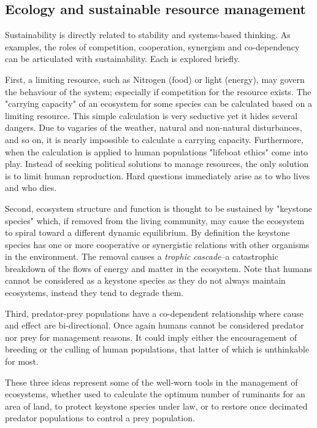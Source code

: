 \subsection{Ecology and sustainable resource management}

Sustainability is directly related to stability and systems-based thinking. As examples, the roles of competition, cooperation, synergism and co-dependency can be articulated with sustainability. Each is explored briefly.

First, a limiting resource, such as Nitrogen (food) or light (energy), may govern the behaviour of the system; especially if competition for the resource exists. The "carrying capacity" of an ecosystem for some species can be calculated based on a limiting resource. This simple calculation is very seductive yet it hides several dangers. Due to vagaries of the weather, natural and non-natural disturbances, and so on, it is nearly impossible to calculate a carrying capacity. Furthermore, when the calculation is applied to human populations "lifeboat ethics" come into play. Instead of seeking political solutions to manage resources, the only solution is to limit human reproduction. Hard questions immediately arise as to who lives and who dies.

Second, ecosystem structure and function is thought to be sustained by "keystone species" which, if removed from the living community, may cause the ecosystem to spiral toward a different dynamic equilibrium. By definition the keystone species has one or more cooperative or synergistic relations with other organisms in the environment. The removal causes a \textit{trophic cascade}--a catastrophic breakdown of the flows of energy and matter in the ecosystem. Note that humans cannot be considered as a keystone species as they do not always maintain ecosystems, instead they tend to degrade them. 

Third, predator-prey populations have a co-dependent relationship where cause and effect are bi-directional. Once again humans cannot be considered predator nor prey for management reasons. It could imply either the encouragement of breeding or the culling of human populations, that latter of which is unthinkable for most. 

These three ideas represent some of the well-worn tools in the management of ecosystems, whether used to calculate the optimum number of ruminants for an area of land, to protect keystone species under law, or to restore once decimated predator populations to control a prey population. 

